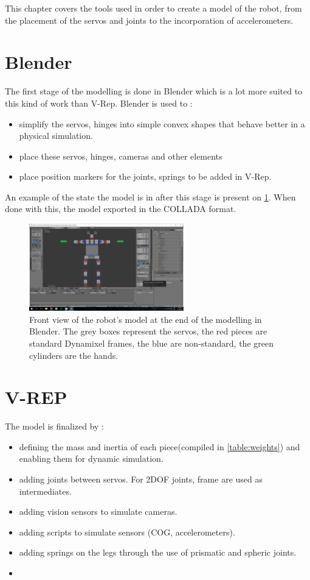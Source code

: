 This chapter covers the tools used in order to create a model of the robot, from the placement of the servos and joints to the incorporation of accelerometers.

\section{Blender}
The first stage of the modelling is done in Blender which is a lot more suited to this kind of work than V-Rep. 
Blender is used to :
\begin{itemize}
\item simplify the servos, hinges into simple convex shapes that behave better in a physical simulation.
\item place these servos, hinges, cameras and other elements
\item place position markers for the joints, springs to be added in V-Rep.
\end{itemize}
An example of the state the model is in after this stage is present on \cref{fig:modelling_blender}. When done with this, the model exported in the COLLADA format.

\begin{figure}[htp]
\center
\includegraphics[width=0.6\textwidth]{figures/modelling_blender}
\caption[Front view of the robot's model at the end of the modelling in Blender]{Front view of the robot's model at the end of the modelling in Blender. The grey boxes represent the servos, the red pieces are standard Dynamixel frames, the blue are non-standard, the green cylinders are the hands.}
\label{fig:modelling_blender}
\end{figure}

\section{V-REP}
The model is finalized by :
\begin{itemize}
\item defining the mass and inertia of each piece(compiled in \cref{table:weights}) and enabling them for dynamic simulation.
\item adding joints between servos. For 2DOF joints, frame are used as intermediates.
\item adding vision sensors to simulate cameras.
\item adding scripts to simulate sensors (COG, accelerometers).
\item adding springs on the legs through the use of prismatic and spheric joints.
\item
\end{itemize}

